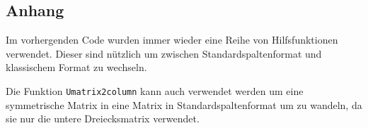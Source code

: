 \subsection{Anhang}\label{Anhang}
Im vorhergenden Code wurden immer wieder eine Reihe von Hilfsfunktionen verwendet.
Dieser sind nützlich um zwischen Standardspaltenformat und klassischem Format zu 
wechseln.



Die Funktion {\tt Umatrix2column} kann auch verwendet werden um eine symmetrische
Matrix in eine Matrix in Standardspaltenformat um zu wandeln, da sie nur die
untere Dreiecksmatrix verwendet.

